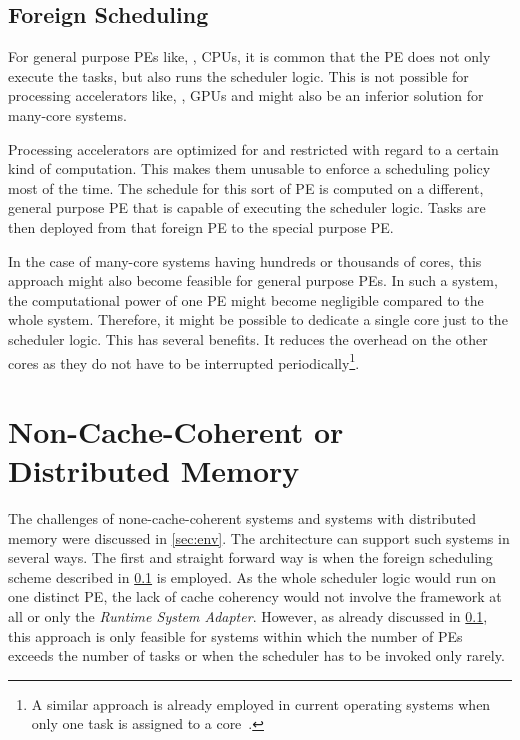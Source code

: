 \subsection{Foreign Scheduling}%
\label{sec:prop:computation:foreign}

For general purpose \acp{PE} like, \eg{}, \acp{CPU}, it is common that the \ac{PE} does not only execute the tasks, but also runs the scheduler logic. This is not possible for processing accelerators like, \eg{}, \acp{GPU} and might also be an inferior solution for many-core systems.

Processing accelerators are optimized for and restricted with regard to a certain kind of computation. This makes them unusable to enforce a scheduling policy most of the time. The schedule for this sort of \ac{PE} is computed on a different, general purpose \ac{PE} that is capable of executing the scheduler logic. Tasks are then deployed from that foreign \ac{PE} to the special purpose \ac{PE}.

In the case of many-core systems having hundreds or thousands of cores, this approach might also become feasible for general purpose \acp{PE}. In such a system, the computational power of one \ac{PE} might become negligible compared to the whole system. Therefore, it might be possible to dedicate a single core just to the scheduler logic. This has several benefits. It reduces the overhead on the other cores as they do not have to be interrupted periodically\footnote{A similar approach is already employed in current operating systems when only one task is assigned to a core~\cite{Linux-2015-NoHZ}.}.

\section{Non-Cache-Coherent or Distributed Memory}%
\label{sec:compo:distributed}

The challenges of none-cache-coherent systems and systems with distributed memory were discussed in \cref{sec:env}. The \cobas{} architecture can support such systems in several ways. The first and straight forward way is when the foreign scheduling scheme described in \cref{sec:prop:computation:foreign} is employed. As the whole scheduler logic would run on one distinct \ac{PE}, the lack of cache coherency would not involve the \cobas{} framework at all or only the \emph{Runtime System Adapter}. However, as already discussed in \cref{sec:prop:computation:foreign}, this approach is only feasible for systems within which the number of \acp{PE} exceeds the number of tasks or when the scheduler has to be invoked only rarely.

